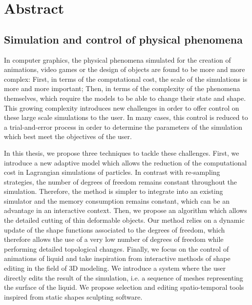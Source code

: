 \chapter*[Abstract]{Abstract}

\section*{\Large{Simulation and control of physical phenomena}}

In computer graphics, the physical phenomena simulated for the creation of animations, video games or the design of objects are found to be more and more complex:
First, in terms of the computational cost, the scale of the simulations is more and more important;
Then, in terms of the complexity of the phenomena themselves, which require the models to be able to change their state and shape.
This growing complexity introduces new challenges in order to offer control on these large scale simulations to the user.
In many cases, this control is reduced to a trial-and-error process in order to determine the parameters of the simulation which best meet the objectives of the user.

In this thesis, we propose three techniques to tackle these challenges.
First, we introduce a new adaptive model which allows the reduction of the computational cost in Lagrangian simulations of particles.
In contrast with re-sampling strategies, the number of degrees of freedom remains constant throughout the simulation.
Therefore, the method is simpler to integrate into an existing simulator and the memory consumption remains constant, which can be an advantage in an interactive context.
Then, we propose an algorithm which allows the detailed cutting of thin deformable objects.
Our method relies on a dynamic update of the shape functions associated to the degrees of freedom, which therefore allows the use of a very low number of degrees of freedom while performing detailed topological changes.
Finally, we focus on the control of animations of liquid and take inspiration from interactive methods of shape editing in the field of 3D modeling.
We introduce a system where the user directly edits the result of the simulation, i.e. a sequence of meshes representing the surface of the liquid.
We propose selection and editing spatio-temporal tools inspired from static shapes sculpting software.
